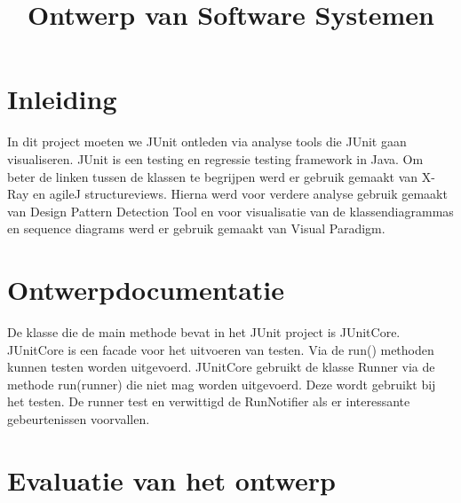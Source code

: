 \documentclass[a4paper, 11pt]{article}
\begin{document}
\begin{titlepage}
\title{Ontwerp van Software Systemen}
\author{}
\end{titlepage}



\maketitle
\newpage
\tableofcontents
\pagebreak

\section*{Inleiding}


In dit project moeten we JUnit ontleden via analyse tools die JUnit gaan visualiseren. JUnit is een testing en regressie testing framework in Java. Om beter de linken tussen de klassen te begrijpen werd er gebruik gemaakt van X-Ray en agileJ structureviews. Hierna werd voor verdere analyse gebruik gemaakt van Design Pattern Detection Tool en voor visualisatie van de klassendiagrammas en sequence diagrams werd er gebruik gemaakt van Visual Paradigm.


\section{Ontwerpdocumentatie}

De klasse die de main methode bevat in het JUnit project is JUnitCore. JUnitCore is een facade voor het uitvoeren van testen. Via de run() methoden kunnen testen worden uitgevoerd. JUnitCore gebruikt de klasse Runner via de methode run(runner) die niet mag worden uitgevoerd. Deze wordt gebruikt bij het testen. De runner test en verwittigd de RunNotifier als er interessante gebeurtenissen voorvallen. 





\section{Evaluatie van het ontwerp}

\end{document}
